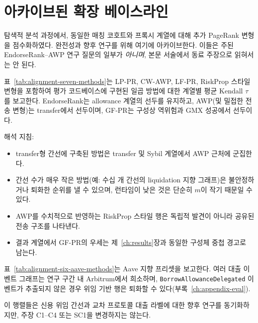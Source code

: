 \section{아카이브된 확장 베이스라인}
\label{ch:appendix-archive}

탐색적 분석 과정에서, 동일한 매칭 코호트와 프록시 계열에 대해 추가 PageRank 변형을 점수화하였다. 완전성과 향후 연구를 위해 여기에 아카이브한다. 이들은 주된 EndorseRank--AWP 연구 질문의 일부가 \emph{아니며}, 본문 서술에서 동료 주장으로 읽혀서는 안 된다.


표~\ref{tab:alignment-seven-methods}는 LP-PR, CW-AWP, LF-PR, RiskProp 스타일 변형을 포함하여 평가 코드베이스에 구현된 일곱 방법에 대한 계열별 평균 Kendall $\tau$를 보고한다. EndorseRank는 allowance 계열의 선두를 유지하고, AWP(및 밀접한 전송 변형)는 transfer에서 선두이며, GF-PR는 구성상 역위험과 GMX 성공에서 선두이다.



해석 지침:

\begin{itemize}
\item transfer형 간선에 구축된 방법은 transfer 및 Sybil 계열에서 AWP 근처에 군집한다.
\item 간선 수가 매우 작은 방법(예: 수십 개 간선의 liquidation 지향 그래프)은 불안정하거나 퇴화한 순위를 낼 수 있으며, 런타임이 낮은 것은 단순히 $m$이 작기 때문일 수 있다.
\item AWP를 수치적으로 반영하는 RiskProp 스타일 행은 독립적 발견이 아니라 공유된 전송 구조를 나타낸다.
\item 결과 계열에서 GF-PR의 우세는 제~\ref{ch:results}장과 동일한 구성체 중첩 경고로 남는다.
\end{itemize}


표~\ref{tab:alignment-six-aave-methods}는 Aave 지향 프리셋을 보고한다. 여러 대출 이벤트 그래프는 연구 구간 내 Arbitrum에서 희소하며, \texttt{BorrowAllowanceDelegated} 이벤트가 추출되지 않은 경우 위임 기반 행은 퇴화할 수 있다(부록~\ref{ch:appendix-eval}).



이 행렬들은 신용 위임 간선과 교차 프로토콜 대출 라벨에 대한 향후 연구를 동기화하지만, 주장 C1--C4 또는 SC1을 변경하지는 않는다.

